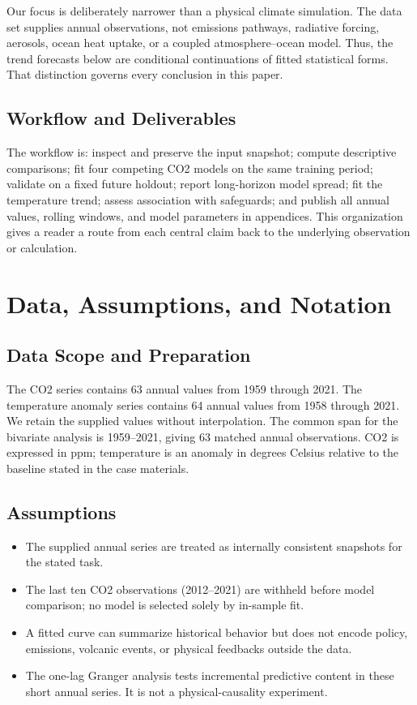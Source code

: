 \documentclass{mcmthesis}
\begin{document}
Our focus is deliberately narrower than a physical climate simulation. The data set supplies annual observations, not emissions pathways, radiative forcing, aerosols, ocean heat uptake, or a coupled atmosphere--ocean model. Thus, the trend forecasts below are conditional continuations of fitted statistical forms. That distinction governs every conclusion in this paper.

\subsection{Workflow and Deliverables}
The workflow is: inspect and preserve the input snapshot; compute descriptive comparisons; fit four competing CO2 models on the same training period; validate on a fixed future holdout; report long-horizon model spread; fit the temperature trend; assess association with safeguards; and publish all annual values, rolling windows, and model parameters in appendices. This organization gives a reader a route from each central claim back to the underlying observation or calculation.

\section{Data, Assumptions, and Notation}
\subsection{Data Scope and Preparation}
The CO2 series contains 63 annual values from 1959 through 2021. The temperature anomaly series contains 64 annual values from 1958 through 2021. We retain the supplied values without interpolation. The common span for the bivariate analysis is 1959--2021, giving 63 matched annual observations. CO2 is expressed in ppm; temperature is an anomaly in degrees Celsius relative to the baseline stated in the case materials.

\subsection{Assumptions}
\begin{itemize}
\item The supplied annual series are treated as internally consistent snapshots for the stated task.
\item The last ten CO2 observations (2012--2021) are withheld before model comparison; no model is selected solely by in-sample fit.
\item A fitted curve can summarize historical behavior but does not encode policy, emissions, volcanic events, or physical feedbacks outside the data.
\item The one-lag Granger analysis tests incremental predictive content in these short annual series. It is not a physical-causality experiment.
\end{itemize}
\end{document}
